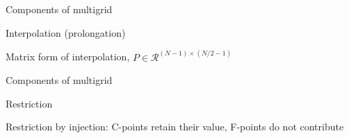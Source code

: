 \documentclass[18pt,xcolor=table]{beamer}
\begin{document}
\begin{frame}{Components of multigrid}
\begin{block}{Interpolation (prolongation)}
\bit
\item Matrix form of interpolation, $P\in\mathcal{R}^{(N-1)\times(N/2-1)}$
\eit
{}
\end{block}
\end{frame}

\begin{frame}{Components of multigrid}
\begin{block}{Restriction}
\bit
\item Restriction by injection: C-points retain their value, F-points do not contribute
\eit
{}
\end{block}
\end{frame}
\end{document}
